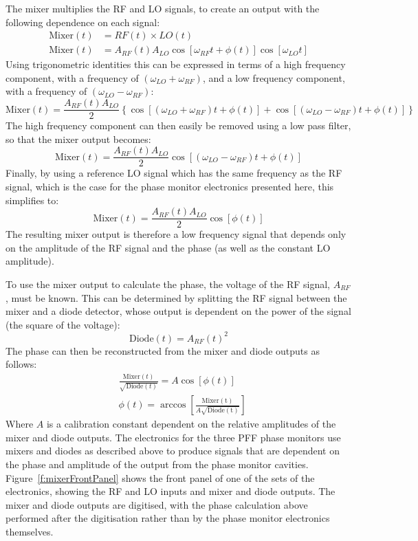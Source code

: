 The mixer multiplies the RF and LO signals, to create an output with the following dependence on each signal:
\begin{align}
\mathrm{Mixer}(t) &= RF(t) \times LO(t) \\
\mathrm{Mixer}(t) &= A_{RF}(t)A_{LO}\cos[\omega_{RF} t + \phi(t)]\cos[\omega_{LO} t]
\end{align}
Using trigonometric identities this can be expressed in terms of a high frequency component, with a frequency of \((\omega_{LO} + \omega_{RF})\), and a low frequency component, with a frequency of  \((\omega_{LO} - \omega_{RF})\):
\begin{equation}
\mathrm{Mixer}(t) = \frac{A_{RF}(t)A_{LO}}{2}\left\lbrace\cos[(\omega_{LO} + \omega_{RF})t + \phi(t)] + \cos[(\omega_{LO} - \omega_{RF})t + \phi(t)]\right\rbrace
\end{equation}
The high frequency component can then easily be removed using a low pass filter, so that the mixer output becomes:
\begin{equation}
\mathrm{Mixer}(t) = \frac{A_{RF}(t)A_{LO}}{2}\cos[(\omega_{LO} - \omega_{RF})t + \phi(t)]
\label{e:mixOutAnyFreq} 
\end{equation}
Finally, by using a reference LO signal which has the same frequency as the RF signal, which is the case for the phase monitor electronics presented here, this simplifies to:
\begin{equation}
\mathrm{Mixer}(t) = \frac{A_{RF}(t)A_{LO}}{2}\cos[\phi(t)]
\label{e:mixOutSameFreq} 
\end{equation}
The resulting mixer output is therefore a low frequency signal that depends only on the amplitude of the RF signal and the phase (as well as the constant LO amplitude).

To use the mixer output to calculate the phase, the voltage of the RF signal, \(A_{RF}\), must  be known. This can be determined by splitting the RF signal between the mixer and a diode detector, whose output is dependent on the power of the signal (the square of the voltage):
\begin{equation}
\mathrm{Diode}(t) = A_{RF}(t)^2
\label{e:idealDiode}
\end{equation}
The phase can then be reconstructed from the mixer and diode outputs as follows:
\begin{align}
&\frac{\mathrm{Mixer}(t)}{\sqrt{\mathrm{Diode}(t)}} = A\cos[\phi(t)] \label{e:mixOverSqrtDio} \\
&\phi(t) = \arccos\left[\frac{\mathrm{Mixer(t)}}{A\sqrt{\mathrm{Diode(t)}}}\right]
\label{e:phaseRecIdeal} 
\end{align}
Where \(A\) is a calibration constant dependent on the relative amplitudes of the mixer and diode outputs. The electronics for the three PFF phase monitors use mixers and diodes as described above to produce signals that are dependent on the phase and amplitude of the output from the phase monitor cavities. Figure~\ref{f:mixerFrontPanel} shows the front panel of one of the sets of the electronics, showing the RF and LO inputs and mixer and diode outputs. The mixer and diode outputs are digitised, with the phase calculation above performed after the digitisation rather than by the phase monitor electronics themselves. 

